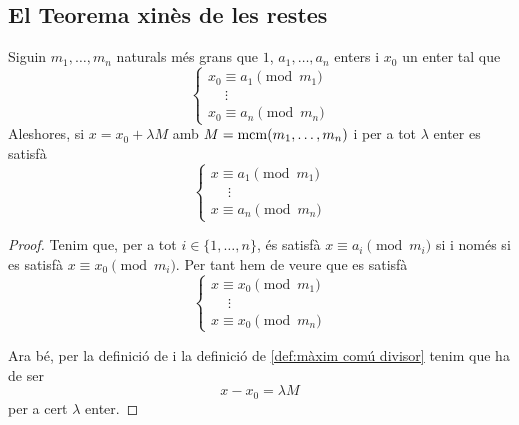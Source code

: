 \documentclass[../../Main.tex]{subfiles}
\begin{document}
	\subsection{El Teorema xinès de les restes}
	\begin{lemma}
		\label{lema:thm:Teorema xinès de les restes}
		Siguin \(m_{1},\dots,m_{n}\) naturals més grans que \(1\), \(a_{1},\dots,a_{n}\) enters i \(x_{0}\) un enter tal que
		\[\begin{cases}
			x_{0}\equiv a_{1}\pmod{m_{1}}\\
			\quad\ \vdots\\
			x_{0}\equiv a_{n}\pmod{m_{n}}
		\end{cases}\]
		Aleshores, si \(x=x_{0}+\lambda M\) amb \(M=\operatorname{mcm}(m_{1},\dots,m_{n})\) i per a tot \(\lambda\) enter es satisfà
		\[\begin{cases}
		x\equiv a_{1}\pmod{m_{1}}\\
		\quad\ \vdots\\
		x\equiv a_{n}\pmod{m_{n}}
		\end{cases}\]
		\begin{proof}
			Tenim que, per a tot \(i\in\{1,\dots,n\}\), és satisfà \(x\equiv a_{i}\pmod{m_{i}}\) si i només si es satisfà \(x\equiv x_{0}\pmod{m_{i}}\). Per tant hem de veure que es satisfà
			\[\begin{cases}
			x\equiv x_{0}\pmod{m_{1}}\\
			\quad\ \vdots\\
			x\equiv x_{0}\pmod{m_{n}}
			\end{cases}\]
			
			Ara bé, per la definició de  i la definició de \ref{def:màxim comú divisor} tenim que ha de ser
			\[x-x_{0}=\lambda M\]
			per a cert \(\lambda\) enter.
		\end{proof}
	\end{lemma}
\end{document}
